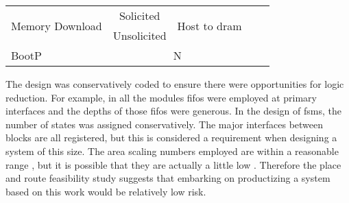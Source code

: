 \begin{table}[h]
\begin{minipage}{1\textwidth}
\begin{tabular}{ |m{4cm}|c|c|c|m{3cm}|}
 \multirow{2}{*}{Memory Download}       &   Solicited   & \multirow{2}{*}{Host to \ac{dram}} &                         &                                                                        \\\cline{2-2}
                                        &   Unsolicited &                                    &                         &                                                                        \\\cline{1-3}
        BootP                           &   \multicolumn{2}{c|}{N}                           &                         &                                                                        \\\cline{1-5}
          \end{tabular}
  \end{minipage}
  \captionsetup{justification=centering, skip=9pt}
  \vspace{0.0cm}
  \label{tab:Features implemented}
\end{table}

The design was conservatively coded to ensure there were opportunities for logic reduction. For example, in all the modules \acp{fifo} were employed at primary interfaces and the depths of those \acp{fifo} were generous.
In the design of \acp{fsm}, the number of states was assigned conservatively.
The major interfaces between blocks are all registered, but this is considered a requirement when designing a system of this size.
The area scaling numbers employed are within a reasonable range \cite{schabel2017energy}, but it is possible that they are actually a little low \cite{schabel2014diss}.
Therefore the place and route feasibility study suggests that embarking on productizing a system based on this work would be relatively low risk.

